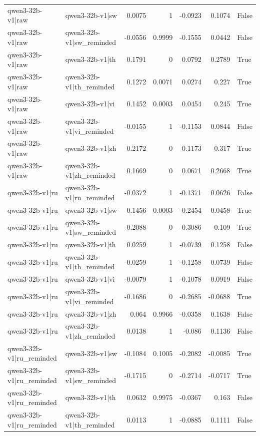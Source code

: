 \begin{table}
\begin{tabular}{l l r r r r l}
qwen3-32b-v1|raw & qwen3-32b-v1|sw & 0.0075 & 1 & -0.0923 & 0.1074 & False \\
qwen3-32b-v1|raw & qwen3-32b-v1|sw_reminded & -0.0556 & 0.9999 & -0.1555 & 0.0442 & False \\
qwen3-32b-v1|raw & qwen3-32b-v1|th & 0.1791 & 0 & 0.0792 & 0.2789 & True \\
qwen3-32b-v1|raw & qwen3-32b-v1|th_reminded & 0.1272 & 0.0071 & 0.0274 & 0.227 & True \\
qwen3-32b-v1|raw & qwen3-32b-v1|vi & 0.1452 & 0.0003 & 0.0454 & 0.245 & True \\
qwen3-32b-v1|raw & qwen3-32b-v1|vi_reminded & -0.0155 & 1 & -0.1153 & 0.0844 & False \\
qwen3-32b-v1|raw & qwen3-32b-v1|zh & 0.2172 & 0 & 0.1173 & 0.317 & True \\
qwen3-32b-v1|raw & qwen3-32b-v1|zh_reminded & 0.1669 & 0 & 0.0671 & 0.2668 & True \\
qwen3-32b-v1|ru & qwen3-32b-v1|ru_reminded & -0.0372 & 1 & -0.1371 & 0.0626 & False \\
qwen3-32b-v1|ru & qwen3-32b-v1|sw & -0.1456 & 0.0003 & -0.2454 & -0.0458 & True \\
qwen3-32b-v1|ru & qwen3-32b-v1|sw_reminded & -0.2088 & 0 & -0.3086 & -0.109 & True \\
qwen3-32b-v1|ru & qwen3-32b-v1|th & 0.0259 & 1 & -0.0739 & 0.1258 & False \\
qwen3-32b-v1|ru & qwen3-32b-v1|th_reminded & -0.0259 & 1 & -0.1258 & 0.0739 & False \\
qwen3-32b-v1|ru & qwen3-32b-v1|vi & -0.0079 & 1 & -0.1078 & 0.0919 & False \\
qwen3-32b-v1|ru & qwen3-32b-v1|vi_reminded & -0.1686 & 0 & -0.2685 & -0.0688 & True \\
qwen3-32b-v1|ru & qwen3-32b-v1|zh & 0.064 & 0.9966 & -0.0358 & 0.1638 & False \\
qwen3-32b-v1|ru & qwen3-32b-v1|zh_reminded & 0.0138 & 1 & -0.086 & 0.1136 & False \\
qwen3-32b-v1|ru_reminded & qwen3-32b-v1|sw & -0.1084 & 0.1005 & -0.2082 & -0.0085 & True \\
qwen3-32b-v1|ru_reminded & qwen3-32b-v1|sw_reminded & -0.1715 & 0 & -0.2714 & -0.0717 & True \\
qwen3-32b-v1|ru_reminded & qwen3-32b-v1|th & 0.0632 & 0.9975 & -0.0367 & 0.163 & False \\
qwen3-32b-v1|ru_reminded & qwen3-32b-v1|th_reminded & 0.0113 & 1 & -0.0885 & 0.1111 & False \\

\end{tabular}
\end{table}

